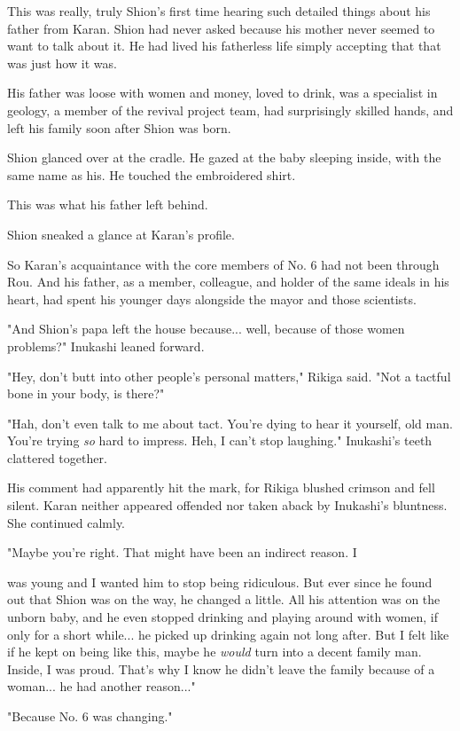 This was really, truly Shion's first time hearing such detailed things
about his father from Karan. Shion had never asked because his mother
never seemed to want to talk about it. He had lived his fatherless life
simply accepting that that was just how it was.

His father was loose with women and money, loved to drink, was a
specialist in geology, a member of the revival project team, had
surprisingly skilled hands, and left his family soon after Shion was
born.

Shion glanced over at the cradle. He gazed at the baby sleeping inside,
with the same name as his. He touched the embroidered shirt.

This was what his father left behind.

Shion sneaked a glance at Karan's profile.

So Karan's acquaintance with the core members of No. 6 had not been
through Rou. And his father, as a member, colleague, and holder of the
same ideals in his heart, had spent his younger days alongside the mayor
and those scientists.

"And Shion's papa left the house because... well, because of those women
problems?" Inukashi leaned forward.

"Hey, don't butt into other people's personal matters," Rikiga said.
"Not a tactful bone in your body, is there?"

"Hah, don't even talk to me about tact. You're dying to hear it
yourself, old man. You're trying \emph{so} hard to impress. Heh, I can't stop
laughing." Inukashi's teeth clattered together.

His comment had apparently hit the mark, for Rikiga blushed crimson and
fell silent. Karan neither appeared offended nor taken aback by
Inukashi's bluntness. She continued calmly.

"Maybe you're right. That might have been an indirect reason. I~

was young and I wanted him to stop being ridiculous. But ever since he
found out that Shion was on the way, he changed a little. All his
attention was on the unborn baby, and he even stopped drinking and
playing around with women, if only for a short while... he picked up
drinking again not long after. But I felt like if he kept on being like
this, maybe he \emph{would} turn into a decent family man. Inside, I was proud.
That's why I know he didn't leave the family because of a woman... he
had another reason..."

"Because No. 6 was changing."

